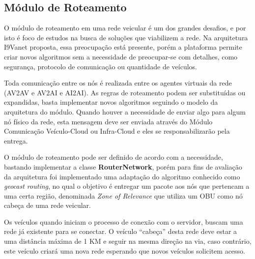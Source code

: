 \documentclass[
	12pt,				%
	oneside,			%
	a4paper,			%
	english,			%
	brazil				%
	]{abntex2ppgsi}
\begin{document}
\subsection{Módulo de Roteamento}

O módulo de roteamento em uma rede veicular é um dos grandes desafios, e por isto é foco de estudos na busca de soluções que viabilizem a rede. Na arquitetura I9Vanet proposta, essa preocupação está presente, porém a plataforma permite criar novos algoritmos sem a necessidade de preocupar-se com detalhes, como segurança, protocolo de comunicação ou quantidade de veículos.

Toda comunicação entre os nós é realizada entre os agentes virtuais da rede (AV2AV e AV2AI e AI2AI). As regras de roteamento podem ser substituídas ou expandidas, basta implementar novos algoritmos seguindo o modelo da arquitetura do módulo. Quando houver a necessidade de enviar algo para algum nó físico da rede, esta mensagem deve ser enviada através do Módulo Comunicação Veículo-Cloud ou Infra-Cloud e eles se responsabilizarão pela entrega.


O módulo de roteamento pode ser definido de acordo com a necessidade, bastando implementar a classe \textbf{RouterNetwork}, porém para fins de avaliação da arquitetura foi implementado uma adaptação do algoritmo conhecido como \textit{geocast routing}, no qual o objetivo é entregar um pacote aos nós que pertencam a uma certa região, denominada \textit{Zone of Relevance} que utiliza um OBU como nó cabeça de uma rede veicular.

Os veículos quando iniciam o processo de conexão com o servidor, buscam uma rede  já existente para se conectar. O veículo ``cabeça'' desta rede deve estar a uma distância máxima de 1 KM e seguir na mesma direção na via, caso contrário, este veículo criará uma nova rede esperando que novos veículos solicitem acesso.
\end{document}
